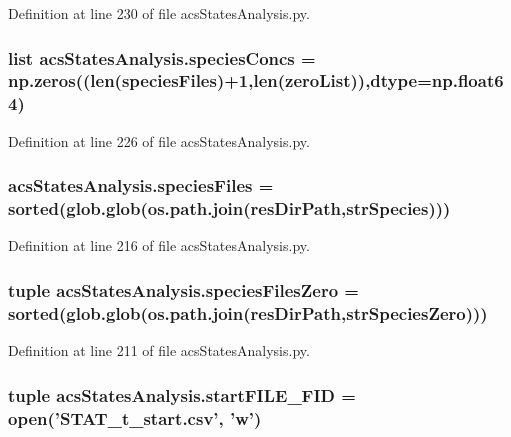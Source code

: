 Definition at line 230 of file acs\-States\-Analysis.\-py.

\hypertarget{a00099_a2377568425051a7511b51f7c50662ba1}{
\subsubsection[{species\-Concs}]{\setlength{\rightskip}{0pt plus 5cm}list acs\-States\-Analysis.\-species\-Concs = np.\-zeros((len({\bf species\-Files})+1,len({\bf zero\-List})),dtype=np.\-float64)}}\label{a00099_a2377568425051a7511b51f7c50662ba1}


Definition at line 226 of file acs\-States\-Analysis.\-py.

\hypertarget{a00099_af3291bd263282353dd4a12ee38c08cae}{
\subsubsection[{species\-Files}]{\setlength{\rightskip}{0pt plus 5cm}acs\-States\-Analysis.\-species\-Files = sorted(glob.\-glob(os.\-path.\-join({\bf res\-Dir\-Path},{\bf str\-Species})))}}\label{a00099_af3291bd263282353dd4a12ee38c08cae}


Definition at line 216 of file acs\-States\-Analysis.\-py.

\hypertarget{a00099_a5584994da277e7798c904342dff18427}{
\subsubsection[{species\-Files\-Zero}]{\setlength{\rightskip}{0pt plus 5cm}tuple acs\-States\-Analysis.\-species\-Files\-Zero = sorted(glob.\-glob(os.\-path.\-join({\bf res\-Dir\-Path},{\bf str\-Species\-Zero})))}}\label{a00099_a5584994da277e7798c904342dff18427}


Definition at line 211 of file acs\-States\-Analysis.\-py.

\hypertarget{a00099_a0239a9dcc4900463a0c19557bec23521}{
\subsubsection[{start\-F\-I\-L\-E\-\_\-\-F\-I\-D}]{\setlength{\rightskip}{0pt plus 5cm}tuple acs\-States\-Analysis.\-start\-F\-I\-L\-E\-\_\-\-F\-I\-D = open('S\-T\-A\-T\-\_\-t\-\_\-start.\-csv', 'w')}}\label{a00099_a0239a9dcc4900463a0c19557bec23521}


